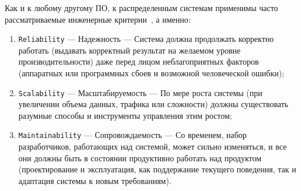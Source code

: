 Как и к любому другому ПО, к распределенным системам применимы часто рассматриваемые инженерные критерии~\cite{kleppmann2017designing}, а именно:
\begin{enumerate}
  \item \texttt{Reliability} --- Надежность --- Система должна продолжать корректно работать (выдавать корректный результат на
желаемом уровне производительности) даже перед лицом неблагоприятных факторов (аппаратных или
программных сбоев и возможной человеческой ошибки); 
  \item \texttt{Scalability} --- Масштабируемость --- По мере роста системы (при увеличении объема данных, трафика или сложности) должны существовать разумные способы и инструменты управления этим ростом;
  \item \texttt{Maintainability} --- Сопровождаемость --- Со временем, набор разработчиков, работающих над системой, может сильно изменяться, и все они должны быть в состоянии продуктивно работать над продуктом (проектирование и эксплуатация, как поддержание текущего поведения, так и адаптация системы к новым требованиям). 
\end{enumerate}
%
%
